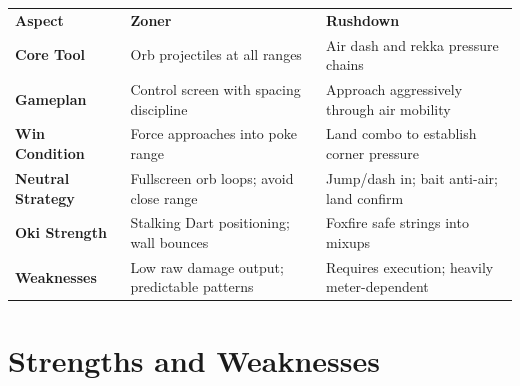 \documentclass[12pt, a4paper]{report}
\begin{document}
\begin{center}
\begin{tabularx}{\linewidth}{L{3cm} L{5cm} L{5cm}}
\textcolor{ahriCyan}{\textbf{Aspect}} & \textcolor{ahriCyan}{\textbf{Zoner}} & \textcolor{ahriMagenta}{\textbf{Rushdown}} \\
\textbf{Core Tool} & Orb projectiles at all ranges & Air dash and rekka pressure chains \\
\textbf{Gameplan} & Control screen with spacing discipline & Approach aggressively through air mobility \\
\textbf{Win Condition} & Force approaches into poke range & Land combo to establish corner pressure \\
\textbf{Neutral Strategy} & Fullscreen orb loops; avoid close range & Jump/dash in; bait anti-air; land confirm \\
\textbf{Oki Strength} & Stalking Dart positioning; wall bounces & Foxfire safe strings into mixups \\
\textbf{Weaknesses} & Low raw damage output; predictable patterns & Requires execution; heavily meter-dependent \\
\end{tabularx}
\end{center}

\section{Strengths and Weaknesses}
\end{document}
